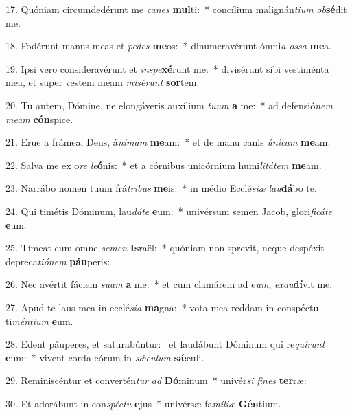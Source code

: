 17. Quóniam circumdedérunt me \textit{ca}\textit{nes} \textbf{mul}ti:~*  concílium malignán\textit{ti}\textit{um} \textit{ob}\textbf{sé}dit me.\

18. Fodérunt manus meas et \textit{pe}\textit{des} \textbf{me}os:~*  dinumeravérunt ómni\textit{a} \textit{os}\textit{sa} \textbf{me}a.\

19. Ipsi vero consideravérunt et \textit{in}\textit{spe}\textbf{xé}runt me:~*  divisérunt sibi vestiménta mea, et super vestem meam \textit{mi}\textit{sé}\textit{runt} \textbf{sor}tem.\

20. Tu autem, Dómine, ne elongáveris auxílium \textit{tu}\textit{um} \textbf{a} me:~*  ad defensió\textit{nem} \textit{me}\textit{am} \textbf{cón}spice.\

21. Erue a frámea, Deus, á\textit{ni}\textit{mam} \textbf{me}am:~*  et de manu canis \textit{ú}\textit{ni}\textit{cam} \textbf{me}am.\

22. Salva me ex o\textit{re} \textit{le}\textbf{ó}nis:~*  et a córnibus unicórnium humi\textit{li}\textit{tá}\textit{tem} \textbf{me}am.\

23. Narrábo nomen tuum frá\textit{tri}\textit{bus} \textbf{me}is:~*  in médio Ecclé\textit{si}\textit{æ} \textit{lau}\textbf{dá}bo te.\

24. Qui timétis Dóminum, lau\textit{dá}\textit{te} \textbf{e}um:~*  univérsum semen Jacob, glori\textit{fi}\textit{cá}\textit{te} \textbf{e}um.\

25. Tímeat eum omne \textit{se}\textit{men} \textbf{Is}raël:~*  quóniam non sprevit, neque despéxit depreca\textit{ti}\textit{ó}\textit{nem} \textbf{páu}peris:\

26. Nec avértit fáciem \textit{su}\textit{am} \textbf{a} me:~*  et cum clamárem ad e\textit{um}, \textit{ex}\textit{au}\textbf{dí}vit me.\

27. Apud te laus mea in ecclé\textit{si}\textit{a} \textbf{ma}gna:~*  vota mea reddam in conspéctu ti\textit{mén}\textit{ti}\textit{um} \textbf{e}um.\

28. Edent páuperes, et saturabúntur: \dag\  et laudábunt Dóminum qui re\textit{quí}\textit{runt} \textbf{e}um:~*  vivent corda eórum in \textit{sǽ}\textit{cu}\textit{lum} \textbf{sǽ}culi.\

29. Reminiscéntur et convertén\textit{tur} \textit{ad} \textbf{Dó}minum~*  univér\textit{si} \textit{fi}\textit{nes} \textbf{ter}ræ:\

30. Et adorábunt in con\textit{spéc}\textit{tu} \textbf{e}jus~*  univérsæ fa\textit{mí}\textit{li}\textit{æ} \textbf{Gén}tium.\

